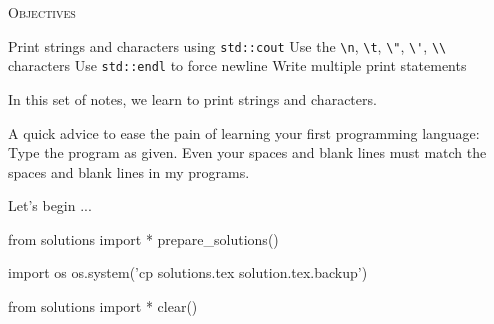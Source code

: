 
\textsc{Objectives}
\begin{myenum}
\li Print strings and characters using \verb!std::cout!
\li Use the \verb!\n!, \verb!\t!, \verb!\"!, \verb!\'!, 
    \verb!\\! characters
\li Use \verb!std::endl! to force newline
\li Write multiple print statements
\end{myenum}

In this set of notes, we learn to print strings and characters.

A quick advice to ease the pain of learning your first programming language: 
Type the program 
 as given. 
Even your spaces and blank lines must match the spaces 
and blank lines in my programs.

Let's begin ...

 
 
 
 


\begin{python0}
from solutions import *
prepare_solutions()
\end{python0}
\begin{python}
import os
os.system('cp solutions.tex solution.tex.backup')  
\end{python}

\begin{python0}
from solutions import *
clear()
\end{python0}
